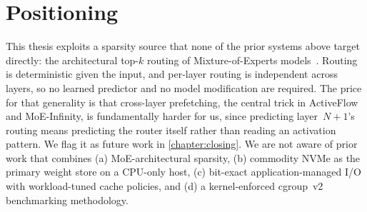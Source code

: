 \section{Positioning}\label{sec:rw-positioning}

This thesis exploits a sparsity source that none of the prior systems above target directly: the architectural top-$k$ routing of Mixture-of-Experts models~\cite{shazeer2017moe,fedus2022switch}.
Routing is deterministic given the input, and per-layer routing is independent across layers, so no learned predictor and no model modification are required.
The price for that generality is that cross-layer prefetching, the central trick in ActiveFlow and MoE-Infinity, is fundamentally harder for us, since predicting layer~$N{+}1$'s routing means predicting the router itself rather than reading an activation pattern.
We flag it as future work in \autoref{chapter:closing}.
We are not aware of prior work that combines (a) MoE-architectural sparsity, (b) commodity NVMe as the primary weight store on a CPU-only host, (c) bit-exact application-managed I/O with workload-tuned cache policies, and (d) a kernel-enforced cgroup~v2 benchmarking methodology.

